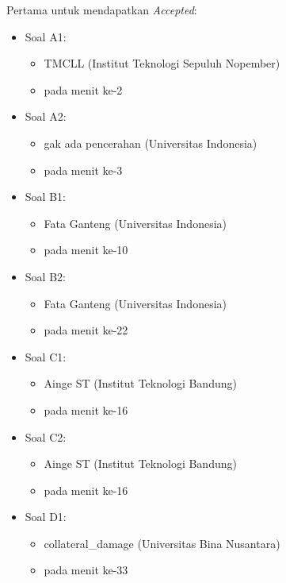 \documentclass[a4paper]{article}
\begin{document}
\begin{itemize}
Pertama untuk mendapatkan \textit{Accepted}:

\begin{itemize}
\item Soal A1:
\begin{itemize}
\item TMCLL (Institut Teknologi Sepuluh Nopember)
\item pada menit ke-2
\end{itemize}

\item Soal A2:
\begin{itemize}
\item gak ada pencerahan (Universitas Indonesia)
\item pada menit ke-3
\end{itemize}

\item Soal B1:
\begin{itemize}
\item Fata Ganteng (Universitas Indonesia)
\item pada menit ke-10
\end{itemize}

\item Soal B2:
\begin{itemize}
\item Fata Ganteng (Universitas Indonesia)
\item pada menit ke-22
\end{itemize}

\item Soal C1:
\begin{itemize}
\item Ainge ST (Institut Teknologi Bandung)
\item pada menit ke-16
\end{itemize}

\item Soal C2:
\begin{itemize}
\item Ainge ST (Institut Teknologi Bandung)
\item pada menit ke-16
\end{itemize}

\item Soal D1:
\begin{itemize}
\item collateral\_damage (Universitas Bina Nusantara)
\item pada menit ke-33
\end{itemize}


\end{itemize}
\end{itemize}
\end{document}
